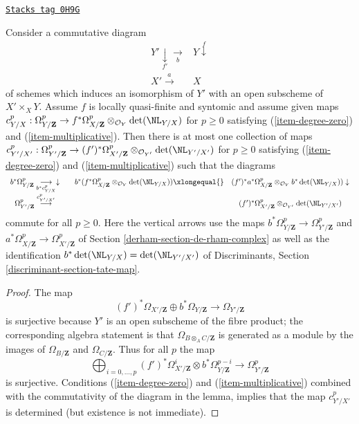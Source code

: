 \begin{lemma}
\label{derham-lemma-base-change-Garel-upstairs}
\href{https://stacks.math.columbia.edu/tag/0H9G}{\texttt{Stacks tag 0H9G}}

Consider a commutative diagram
$$
\begin{array}{cc}Y' \underset{f'}{\downarrow}\underset{b}{\longrightarrow} & Y \overset{f}{\downarrow} \\ X' \overset{a}{\longrightarrow} & X\end{array}
$$
of schemes which induces an isomorphism of $Y'$ with an open subscheme of
$X' \times_X Y$. Assume $f$ is locally quasi-finite and syntomic and
assume given maps $c^p_{Y/X} : \Omega^p_{Y/\mathbf{Z}} \to
f^*\Omega^p_{X/\mathbf{Z}} \otimes_{\mathcal{O}_Y} \det(\NL_{Y/X})$
for $p \geq 0$ satisfying
(\ref{item-degree-zero}) and (\ref{item-multiplicative}).
Then there is at most one collection of maps
$c^p_{Y'/X'} : \Omega^p_{Y'/\mathbf{Z}} \to
(f')^*\Omega^p_{X'/\mathbf{Z}} \otimes_{\mathcal{O}_{Y'}} \det(\NL_{Y'/X'})$
for $p \geq 0$
satisfying (\ref{item-degree-zero}) and (\ref{item-multiplicative})
such that the diagrams
$$
\begin{array}{cccc}b^*\Omega^p_{Y/\mathbf{Z}} \underset{b^*c^p_{Y/X}}{\longrightarrow}\downarrow &  & b^*(f^*\Omega^p_{X/\mathbf{Z}} \otimes_{\mathcal{O}_Y} \det(\NL_{Y/X}))
\xlongequal{} & (f')^*a^*\Omega^p_{X/\mathbf{Z}} \otimes_{\mathcal{O}_Y} b^*\det(\NL_{Y/X}))
\downarrow \\ \Omega^p_{Y'/\mathbf{Z}} \overset{c^p_{Y'/X'}}{\longrightarrow} &  &  & (f')^*\Omega^p_{X'/\mathbf{Z}} \otimes_{\mathcal{O}_{Y'}} \det(\NL_{Y'/X'})\end{array}
$$
commute for all $p \geq 0$. Here the vertical arrows use the maps
$b^*\Omega^p_{Y/\mathbf{Z}} \to \Omega^p_{Y'/\mathbf{Z}}$ and
$a^*\Omega^p_{X/\mathbf{Z}} \to \Omega^p_{X'/\mathbf{Z}}$
of Section \ref{derham-section-de-rham-complex}
as well as the identification $b^*\det(\NL_{Y/X}) = \det(\NL_{Y'/X'})$ of
Discriminants, Section \ref{discriminant-section-tate-map}.
\end{lemma}

\begin{proof}
The map
$$
(f')^*\Omega_{X'/\mathbf{Z}} \oplus b^*\Omega_{Y/\mathbf{Z}}
\longrightarrow
\Omega_{Y'/\mathbf{Z}}
$$
is surjective because $Y'$ is an open subscheme of the fibre product;
the corresponding algebra statement is that $\Omega_{B \otimes_A C/\mathbf{Z}}$
is generated as a module by the images of $\Omega_{B/\mathbf{Z}}$ and
$\Omega_{C/\mathbf{Z}}$. Thus for all $p$ the map
$$
\bigoplus\nolimits_{i = 0, \ldots, p}
(f')^*\Omega^i_{X'/\mathbf{Z}} \otimes
b^*\Omega^{p - i}_{Y/\mathbf{Z}}
\longrightarrow
\Omega^p_{Y'/\mathbf{Z}}
$$
is surjective. Conditions (\ref{item-degree-zero}) and
(\ref{item-multiplicative}) combined with the commutativity
of the diagram in the lemma, implies that the map $c^p_{Y'/X'}$
is determined (but existence is not immediate).
\end{proof}

